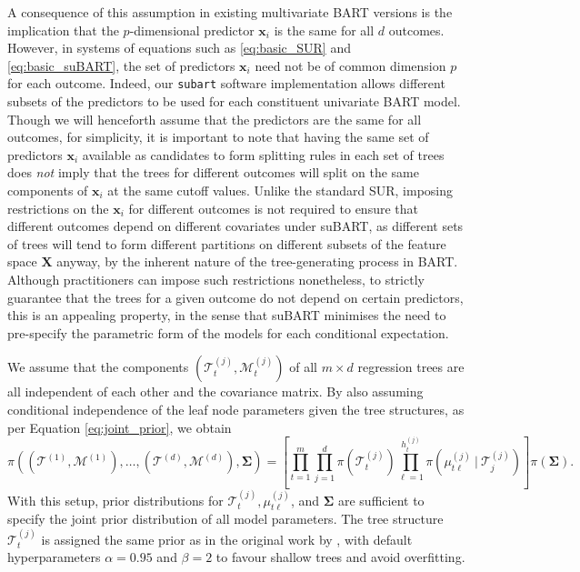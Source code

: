 \documentclass[aoas,preprint]{imsart}
\newcommand\given[1][]{\:#1\vert\:}
\theoremstyle{plain}
\theoremstyle{definition}
\theoremstyle{remark}
\begin{document}
A consequence of this assumption in existing multivariate BART versions is the implication that the $p$-dimensional predictor $\mathbf{x}_i$ is the same for all $d$ outcomes. However, in systems of equations such as \eqref{eq:basic_SUR} and \eqref{eq:basic_suBART}, the set of predictors $\mathbf{x}_i$ need not be of common dimension $p$ for each outcome. Indeed, our \texttt{subart} software implementation allows different subsets of the predictors to be used for each constituent univariate BART model. Though we will henceforth assume that the predictors are the same for all outcomes, for simplicity, it is important to note that having the same set of predictors $\mathbf{x}_i$ available as candidates to form splitting rules in each set of trees does \textit{not} imply that the trees for different outcomes will split on the same components of $\mathbf{x}_i$ at the same cutoff values. Unlike the standard SUR, imposing restrictions on the $\mathbf{x}_i$ for different outcomes is not required to ensure that different outcomes depend on different covariates under suBART, as different sets of trees will tend to form different partitions on different subsets of the feature space $\mathbf{X}$ anyway, by the inherent nature of the tree-generating process in BART. Although practitioners can impose such restrictions nonetheless, to strictly guarantee that the trees for a given outcome do not depend on certain predictors, this is an appealing property, in the sense that suBART minimises the need to pre-specify the parametric form of the models for each conditional expectation.

We assume that the components $(\mathcal{T}_t^{(j)},\mathcal{M}_t^{(j)})$ of all $m \times d$ regression trees are all independent of each other and the covariance matrix. By also assuming conditional independence of the leaf node parameters given the tree structures, as per 
Equation \eqref{eq:joint_prior}, we obtain
\[
\pi\left(\left(\boldsymbol{\mathcal{T}}^{(1)},\boldsymbol{\mathcal{M}}^{(1)}\right),\ldots,\left(\boldsymbol{\mathcal{T}}^{(d)},\boldsymbol{\mathcal{M}}^{(d)}\right),\boldsymbol{\Sigma}\right) = \left\lbrack \prod^{m}_{t=1} \prod^{d}_{j=1} \pi\left(\mathcal{T}^{(j)}_{t}\right)\prod^{h^{(j)}_{t}}_{\ell=1} \pi\left(\mu^{(j)}_{t\ell}\given \mathcal{T}^{(j)}_j\right) \right\rbrack\pi\left(\boldsymbol{\Sigma}\right).
\]
With this setup, prior distributions for $\mathcal{T}^{(j)}_{t}, \mu^{(j)}_{t\ell}$, and $\boldsymbol{\Sigma}$ are sufficient to specify the joint prior distribution of all model parameters. The tree structure $\mathcal{T}^{(j)}_{t}$ is assigned the same prior as in the original work by \citet{chipman2010bart}, with default hyperparameters $\alpha = 0.95$ and $\beta = 2$ to favour shallow trees and avoid overfitting. 
\end{document}
